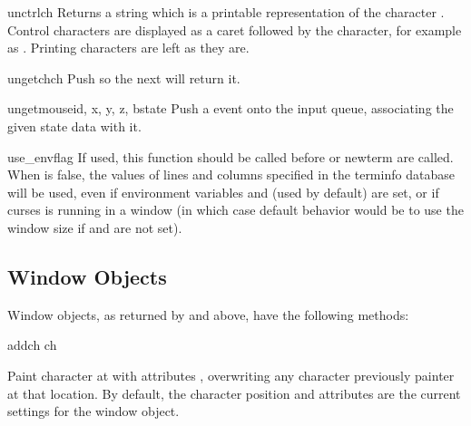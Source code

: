 \begin{funcdesc}{unctrl}{ch}
Returns a string which is a printable representation of the character
.  Control characters are displayed as a caret followed by the
character, for example as . Printing
characters are left as they are.
\end{funcdesc}

\begin{funcdesc}{ungetch}{ch}
Push  so the next  will return it.
\end{funcdesc}

\begin{funcdesc}{ungetmouse}{id, x, y, z, bstate}
Push a  event onto the input queue, associating
the given state data with it.
\end{funcdesc}

\begin{funcdesc}{use_env}{flag}
If used, this function should be called before  or
newterm are called.  When  is false, the values of
lines and columns specified in the terminfo database will be
used, even if environment variables  and
 (used by default) are set, or if curses is running in
a window (in which case default behavior would be to use the window
size if  and  are not set).
\end{funcdesc}

\subsection{Window Objects \label{curses-window-objects}}

Window objects, as returned by  and
 above, have the
following methods:

\begin{methoddesc}{addch}{ ch}

Paint character  at  with attributes
, overwriting any character previously painter at that
location.  By default, the character position and attributes are the
current settings for the window object.
\end{methoddesc}

